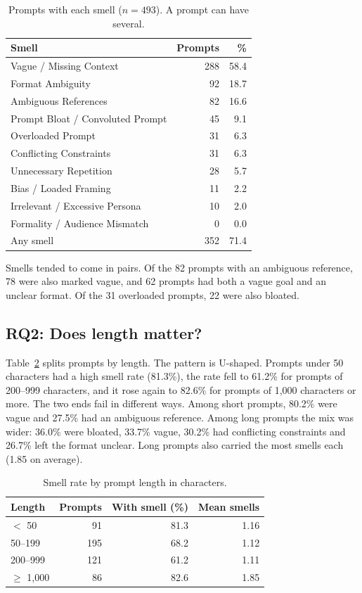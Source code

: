 \documentclass[conference]{IEEEtran}
\begin{document}
\begin{table}[t]
\caption{Prompts with each smell ($n=493$). A prompt can have several.}
\label{tab:freq}
\centering
\begin{tabular}{lrr}
\toprule
Smell & Prompts & \% \\
\midrule
Vague / Missing Context & 288 & 58.4 \\
Format Ambiguity & 92 & 18.7 \\
Ambiguous References & 82 & 16.6 \\
Prompt Bloat / Convoluted Prompt & 45 & 9.1 \\
Overloaded Prompt & 31 & 6.3 \\
Conflicting Constraints & 31 & 6.3 \\
Unnecessary Repetition & 28 & 5.7 \\
Bias / Loaded Framing & 11 & 2.2 \\
Irrelevant / Excessive Persona & 10 & 2.0 \\
Formality / Audience Mismatch & 0 & 0.0 \\
\midrule
Any smell & 352 & 71.4 \\
\bottomrule
\end{tabular}
\end{table}

Smells tended to come in pairs. Of the 82 prompts with an ambiguous reference, 78
were also marked vague, and 62 prompts had both a vague goal and an unclear format.
Of the 31 overloaded prompts, 22 were also bloated.

\subsection{RQ2: Does length matter?}
Table~\ref{tab:len} splits prompts by length. The pattern is U-shaped. Prompts
under 50 characters had a high smell rate (81.3\%), the rate fell to 61.2\% for
prompts of 200--999 characters, and it rose again to 82.6\% for prompts of 1,000
characters or more. The two ends fail in different ways. Among short prompts,
80.2\% were vague and 27.5\% had an ambiguous reference. Among long prompts the
mix was wider: 36.0\% were bloated, 33.7\% vague, 30.2\% had conflicting
constraints and 26.7\% left the format unclear. Long prompts also carried the
most smells each (1.85 on average).

\begin{table}[t]
\caption{Smell rate by prompt length in characters.}
\label{tab:len}
\centering
\begin{tabular}{lrrr}
\toprule
Length & Prompts & With smell (\%) & Mean smells \\
\midrule
$<$ 50 & 91 & 81.3 & 1.16 \\
50--199 & 195 & 68.2 & 1.12 \\
200--999 & 121 & 61.2 & 1.11 \\
$\geq$ 1,000 & 86 & 82.6 & 1.85 \\
\bottomrule
\end{tabular}
\end{table}
\end{document}
